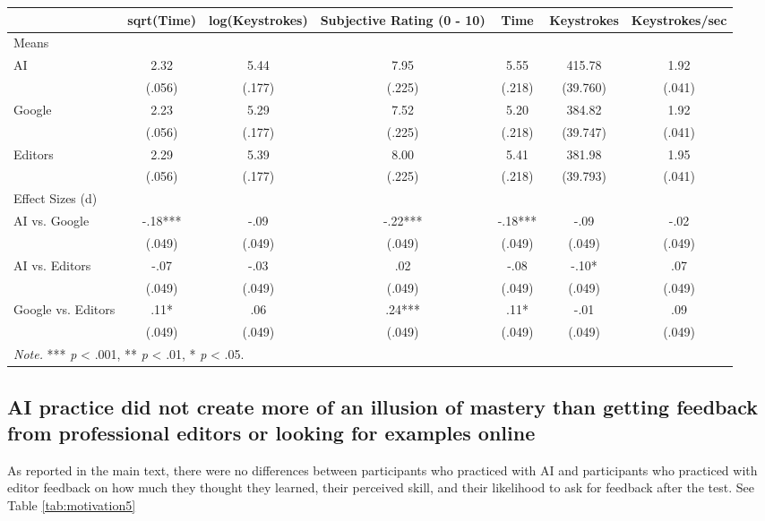 \documentclass[11pt]{report}
\begin{document}
\begin{append}
\begin{landscape}
\begin{table}[]
    \begin{tabular}{lcccccc}
\toprule
  & sqrt(Time) & log(Keystrokes) & Subjective Rating (0 - 10) & Time & Keystrokes & Keystrokes/sec \\ 
\midrule
\multicolumn{7}{l}{Means} \\[2.5pt] 
\midrule
AI & 2.32 & 5.44 & 7.95 & 5.55 & 415.78 & 1.92 \\ 
 & (.056) & (.177) & (.225) & (.218) & (39.760) & (.041) \\ 
Google & 2.23 & 5.29 & 7.52 & 5.20 & 384.82 & 1.92 \\ 
 & (.056) & (.177) & (.225) & (.218) & (39.747) & (.041) \\ 
Editors & 2.29 & 5.39 & 8.00 & 5.41 & 381.98 & 1.95 \\ 
 & (.056) & (.177) & (.225) & (.218) & (39.793) & (.041) \\ 
\midrule
\multicolumn{7}{l}{Effect Sizes (d)} \\[2.5pt] 
\midrule
AI vs. Google & -.18*** & -.09 & -.22*** & -.18*** & -.09 & -.02 \\ 
 & (.049) & (.049) & (.049) & (.049) & (.049) & (.049) \\ 
AI vs. Editors & -.07 & -.03 & .02 & -.08 & -.10* & .07 \\ 
 & (.049) & (.049) & (.049) & (.049) & (.049) & (.049) \\ 
Google vs. Editors & .11* & .06 & .24*** & .11* & -.01 & .09 \\ 
 & (.049) & (.049) & (.049) & (.049) & (.049) & (.049) \\ 
\midrule
\multicolumn{6}{l}{\textit{Note.} *** \textit{p} < .001, ** \textit{p} < .01, * \textit{p} < .05.}
\vspace{5pt}    \end{tabular}
    \label{tab:effort_test5}
\end{table}
\end{landscape}
\subsection{AI practice did not create more of an illusion of mastery than getting feedback from professional editors or looking for examples online}\label{sec:future_learning5}

As reported in the main text, there were no differences between participants who practiced with AI and participants who practiced with editor feedback on how much they thought they learned, their perceived skill, and their likelihood to ask for feedback after the test. See Table \ref{tab:motivation5}


\end{append}
\end{document}
